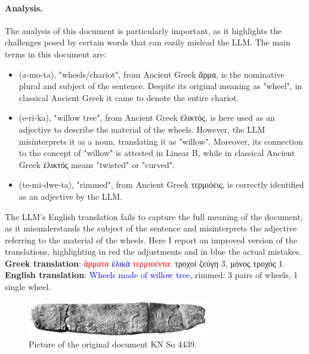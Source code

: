 \paragraph{Analysis.}
The analysis of this document is particularly important, as it highlights the challenges posed by certain words that can easily mislead the LLM.
The main terms in this document are:
\begin{itemize}
  \item \textlinb{\Ba\Bmo\Bta} (a-mo-ta), "wheels/chariot", from Ancient Greek \textgreek{ἅρμα}, is the nominative plural and subject of the sentence.
  Despite its original meaning as "wheel", in classical Ancient Greek it came to denote the entire chariot.
  \item \textlinb{\Be\Bri\Bka} (e-ri-ka), "willow tree", from Ancient Greek \textgreek{ἑλικτός}, is here used as an adjective to describe the material of the wheels.
  However, the LLM misinterprets it as a noun, translating it as "willow". Moreover, its connection to the concept of "willow" is attested in Linear B, while in classical Ancient Greek \textgreek{ἑλικτός} means "twisted" or "curved".
  \item \textlinb{\Bte\Bmi\Bdwe\Bta} (te-mi-dwe-ta), "rimmed", from Ancient Greek \textgreek{τερμιόεις}, is correctly identified as an adjective by the LLM.
\end{itemize}
The LLM's English translation fails to capture the full meaning of the document, as it misunderstands the subject of the sentence and misinterprets the adjective referring to the material of the wheels.
Here I report an improved version of the translations, highlighting in red the adjustments and in blue the actual mistakes. \\
\textbf{Greek translation}: \textcolor{red}{\textgreek{ἅρματα}} \textcolor{blue}{\textgreek{ἑλικά}} \textcolor{red}{\textgreek{τερμιοέντα}}\textgreek{: τροχοί ζεύγη 3, μόνος τροχός 1.} \\ 
\textbf{English translation}: \textcolor{blue}{Wheels made of willow tree}, rimmed: 3 pairs of wheels, 1 single wheel.

\begin{figure}[H]
  \centering
  \includegraphics[width=0.7\textwidth]{Images/568.png} %
  \caption{Picture of the original document KN So 4439.}
  \label{fig:doc5}
\end{figure}

